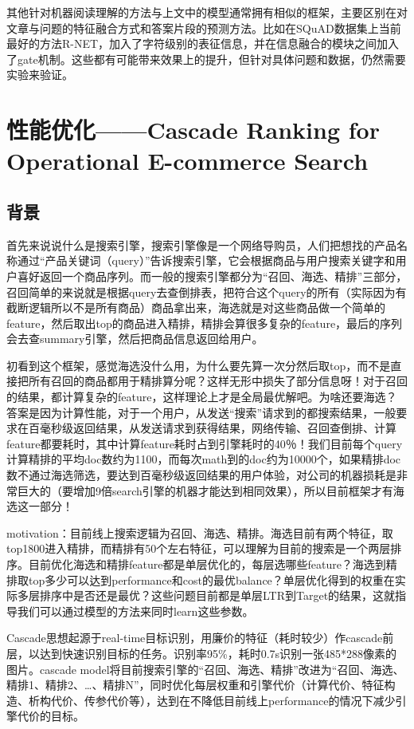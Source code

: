其他针对机器阅读理解的方法与上文中的模型通常拥有相似的框架，主要区别在对文章与问题的特征融合方式和答案片段的预测方法。比如在SQuAD数据集上当前最好的方法R-NET，加入了字符级别的表征信息，并在信息融合的模块之间加入了gate机制。这些都有可能带来效果上的提升，但针对具体问题和数据，仍然需要实验来验证。



\section{性能优化——Cascade Ranking for Operational E-commerce Search}
\subsection{背景}
首先来说说什么是搜索引擎，搜索引擎像是一个网络导购员，人们把想找的产品名称通过“产品关键词（query）”告诉搜索引擎，它会根据商品与用户搜索关键字和用户喜好返回一个商品序列。而一般的搜索引擎都分为“召回、海选、精排”三部分，召回简单的来说就是根据query去查倒排表，把符合这个query的所有（实际因为有截断逻辑所以不是所有商品）商品拿出来，海选就是对这些商品做一个简单的feature，然后取出top的商品进入精排，精排会算很多复杂的feature，最后的序列会去查summary引擎，然后把商品信息返回给用户。

初看到这个框架，感觉海选没什么用，为什么要先算一次分然后取top，而不是直接把所有召回的商品都用于精排算分呢？这样无形中损失了部分信息呀！对于召回的结果，都计算复杂的feature，这样理论上才是全局最优解吧。为啥还要海选？答案是因为计算性能，对于一个用户，从发送“搜索”请求到的都搜索结果，一般要求在百毫秒级返回结果，从发送请求到获得结果，网络传输、召回查倒排、计算feature都要耗时，其中计算feature耗时占到引擎耗时的40％！我们目前每个query计算精排的平均doc数约为1100，而每次math到的doc约为10000个，如果精排doc数不通过海选筛选，要达到百毫秒级返回结果的用户体验，对公司的机器损耗是非常巨大的（要增加9倍search引擎的机器才能达到相同效果），所以目前框架才有海选这一部分！

motivation：目前线上搜索逻辑为召回、海选、精排。海选目前有两个特征，取top1800进入精排，而精排有50个左右特征，可以理解为目前的搜索是一个两层排序。目前优化海选和精排feature都是单层优化的，每层选哪些feature？海选到精排取top多少可以达到performance和cost的最优balance？单层优化得到的权重在实际多层排序中是否还是最优？这些问题目前都是单层LTR到Target的结果，这就指导我们可以通过模型的方法来同时learn这些参数。

Cascade思想起源于real-time目标识别，用廉价的特征（耗时较少）作cascade前层，以达到快速识别目标的任务。识别率95\%，耗时0.7s识别一张485*288像素的图片。cascade model将目前搜索引擎的“召回、海选、精排”改进为“召回、海选、精排1、精排2、…、精排N”，同时优化每层权重和引擎代价（计算代价、特征构造、析构代价、传参代价等），达到在不降低目前线上performance的情况下减少引擎代价的目标。
